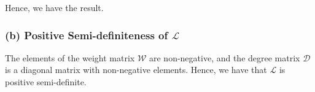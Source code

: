 Hence, we have the result.

\subsubsection*{(b) Positive Semi-definiteness of \( \mathcal{L} \)}

The elements of the weight matrix \( \mathcal{W} \) are non-negative, and the degree matrix \( \mathcal{D} \) is a diagonal matrix with non-negative elements.
Hence, we have that \( \mathcal{L} \) is positive semi-definite.
